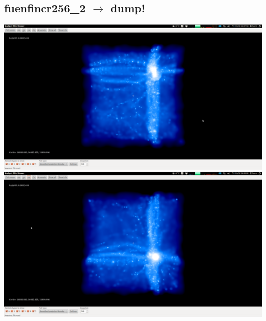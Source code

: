 % 
%
%
%
%
%
%
%


\newpage
\subsection{fuenfincr256\_2 $\rightarrow$ dump!}

\includegraphics[scale=0.12]{fuenfincr256_2/1.png} 
\includegraphics[scale=0.12]{fuenfincr256_2/2.png}

